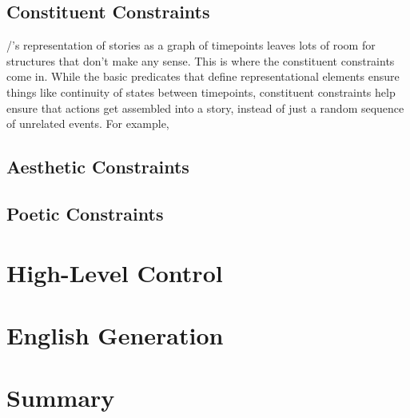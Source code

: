 \subsection{Constituent Constraints}

\dunyazad/'s representation of stories as a graph of timepoints leaves lots of room for structures that don't make any sense.
%
This is where the constituent constraints come in.
%
While the basic predicates that define representational elements ensure things like continuity of states between timepoints, constituent constraints help ensure that actions get assembled into a story, instead of just a random sequence of unrelated events.
%
For example, 

\subsection{Aesthetic Constraints}

\subsection{Poetic Constraints}

\section{High-Level Control}
\label{sec:dunyazad-control}

\section{English Generation}
\label{sec:dunyazad-english}

\section{Summary}
\label{sec:dunyazad-summary}
